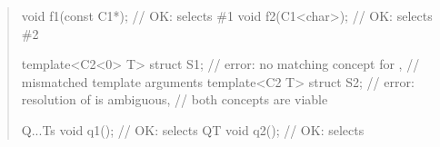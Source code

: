 \begin{quote}
\begin{codeblock}
void f1(const C1*); // OK:  selects \#1
void f2(C1<char>);  // OK:  selects \#2

template<C2<0> T> struct S1; // error: no matching concept for ,
                             // mismatched template arguments
template<C2 T> struct S2;    // error: resolution of  is ambiguous,
                             // both concepts are viable

Q{...Ts} void q1(); // OK: selects 
Q{T} void q2();     // OK: selects 
\end{codeblock}
\exitexample

\end{quote}
